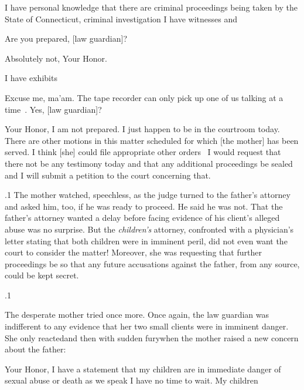 \documentclass[11pt, twoside]{article}
\begin{document}
{{\begin{docDescription}


I have personal knowledge that there are criminal proceedings being taken by the State of Connecticut,
criminal investigation\ellFour{2pt}{2pt} I have witnesses and\mdash{}

Are you prepared, [law guardian]?

Absolutely not, Your Honor.

I have exhibits\mdash{}

Excuse me, ma’am. The tape recorder can only pick
up one of us talking at a time\ellThree{2pt}{2pt}\ . Yes, [law guardian]?

Your Honor, I am not prepared. I just happen to be
in the courtroom today. There are other motions in
this matter scheduled for which [the mother] has been
served. I think [she] could file appropriate other orders \ellThree{2pt}{2pt}\ I would request that there not be any testimony
today and that any additional proceedings be sealed and
I will submit a petition to the court concerning that.

\end{docDescription}

}%

\p.1{%
The mother watched, speechless, as the judge turned to the father’s
attorney and asked him, too, if he was ready to proceed. He said he was
not. That the father’s attorney wanted a delay before facing evidence of
his client’s alleged abuse was no surprise. But the \textit{children’s} attorney,
confronted with a physician’s letter stating that both children were in
imminent peril, did not even want the court to consider the matter!
Moreover, she was requesting that further proceedings be  so
that any future accusations against the father, from any source, could be
kept secret.
}%

\p.1{%
The desperate mother tried once more. Once again, the law guardian
was indifferent to any evidence that her two small clients were in imminent danger. She only reacted\mdash{}and then with sudden fury\mdash{}when the
mother raised a new concern about the father:

\begin{docDescription}


Your Honor, I have a statement that my children
are in immediate danger of sexual abuse or death as we
speak\ellFour{2pt}{2pt} I have no time to wait. My children\mdash{}


\end{docDescription}}}
\end{document}
